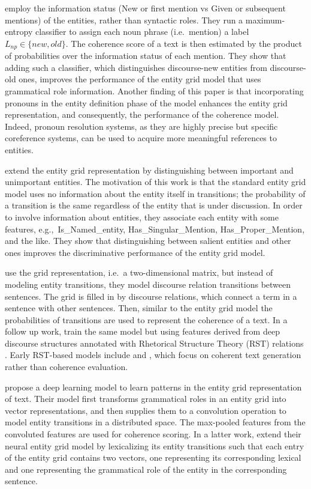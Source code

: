  employ the information status (New or first mention vs Given or subsequent mentions) of the entities, rather than syntactic roles. 
They run a maximum-entropy classifier to assign each noun phrase (i.e.\ mention) a label $L_{np} \in \lbrace new, old \rbrace$. 
The coherence score of a text is then estimated by the product of probabilities over the information status of each mention. 
They show that adding such a classifier, which distinguishes discourse-new entities from discourse-old ones, improves the performance of the entity grid model that uses grammatical role information.  
Another finding of this paper is that incorporating pronouns in the entity definition phase of the model enhances the entity grid representation, and consequently, the performance of the coherence model. 
Indeed, pronoun resolution systems, as they are highly precise but specific coreference systems, can be used to acquire more meaningful references to entities. 

 extend the entity grid representation by distinguishing between important and unimportant entities. 
The motivation of this work is that the standard entity grid model uses no information about the entity itself in transitions; the probability of a transition is the same regardless of the entity that is under discussion. 
In order to involve information about entities, they associate each entity with some features, e.g.,\ Is\_Named\_entity, Has\_Singular\_Mention, Has\_Proper\_Mention, and the like. 
They show that distinguishing between salient entities and other ones improves the discriminative performance of the entity grid model. 

 use the grid representation, i.e.\ a two-dimensional matrix, but instead of modeling entity transitions, they model discourse relation transitions between sentences. 
The grid is filled in by discourse relations, which connect a term in a sentence with other sentences. 
Then, similar to the entity grid model the probabilities of transitions are used to represent the coherence of a text. 
In a follow up work,  train the same model but using features derived from deep discourse structures annotated with Rhetorical Structure Theory (RST) relations \cite{mann88,prasad08a}. 
Early RST-based models include  and , which focus on coherent text generation rather than coherence evaluation.

 propose a deep learning model to learn patterns in the entity grid representation of text. 
Their model first transforms grammatical roles in an entity grid into vector representations, and then supplies them to a convolution operation to model entity transitions in a distributed space. 
The max-pooled features from the convoluted features are used for coherence scoring. 
In a latter work,  extend their neural entity grid model by lexicalizing its entity transitions such that each entry of the entity grid contains two vectors, one representing its corresponding lexical and one representing the grammatical role of the entity in the corresponding sentence.  

